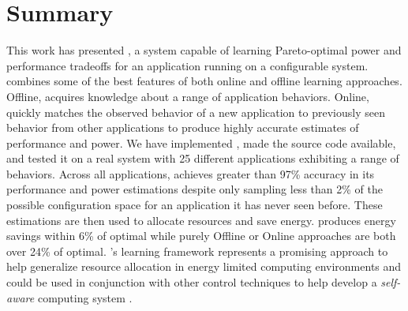 \section{Summary}
\label{sec:conclusion}
This work has presented \SYSTEMLEO{}, a system capable of learning
Pareto-optimal power and performance tradeoffs for an application
running on a configurable system.  \SYSTEMLEO{} combines some of the best
features of both online and offline learning approaches.  Offline,
\SYSTEMLEO{} acquires knowledge about a range of application behaviors.
Online, \SYSTEMLEO{} quickly matches the observed behavior of a new
application to previously seen behavior from other applications to
produce highly accurate estimates of performance and power.  We have
implemented \SYSTEMLEO{}, made the source code available, and tested it
on a real system with 25 different applications exhibiting a range of
behaviors.  Across all applications, \SYSTEMLEO{} achieves greater than
97\% accuracy in its performance and power estimations despite only
sampling less than 2\% of the possible configuration space for an
application it has never seen before.  These estimations are then used
to allocate resources and save energy.  \SYSTEMLEO{} produces energy
savings within 6\% of optimal while purely Offline or Online
approaches are both over 24\% of optimal.  \SYSTEMLEO{}'s learning
framework represents a promising approach to help generalize resource
allocation in energy limited computing environments and could be used
in conjunction with other control techniques to help develop a
\emph{self-aware} computing system
\cite{Hoffmann2012,1508273,1333571,1516538,Kephardt2005,laddaga1999}.
